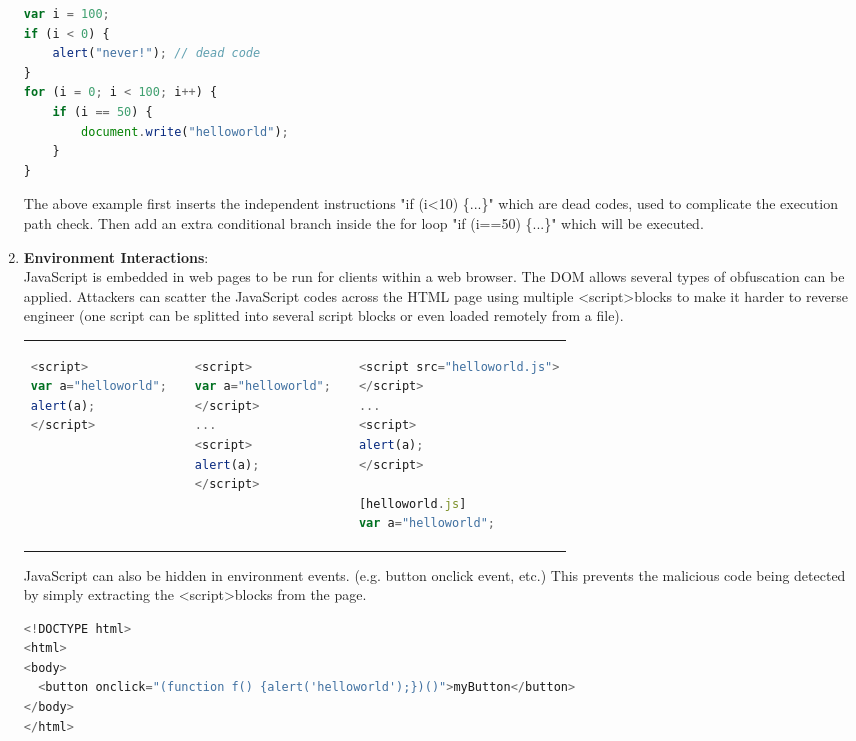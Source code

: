 \documentclass[11pt]{article}
\begin{document}
\begin{enumerate}
	\begin{lstlisting}[language=JavaScript, title=(logic structure obfuscation example)]
var i = 100;
if (i < 0) {
    alert("never!"); // dead code
}
for (i = 0; i < 100; i++) {
    if (i == 50) {
        document.write("helloworld");
    }
}
\end{lstlisting}
	The above example first inserts the independent instructions "if (i\textless 10) \{...\}" which are dead codes, used to complicate the execution path check. Then add an extra conditional branch inside the for loop "if (i==50) \{...\}" which will be executed.
	\item \textbf{Environment Interactions}\cite{Nofus}: \\
	JavaScript is embedded in web pages to be run for clients within a web browser. The DOM allows several types of obfuscation can be applied. Attackers can scatter the JavaScript codes across the HTML page using multiple \textless script\textgreater blocks to make it harder to reverse engineer (one script can be splitted into several script blocks or even loaded remotely from a file).  \\
	\begin{tabular}{p{4cm}p{0.02cm}p{4cm}p{0.02cm}p{5.6cm}}
			\begin{lstlisting}[language=JavaScript,alsolanguage=HTML5,  title=(self-contained block)]
<script>
var a="helloworld";
alert(a);
</script>
			\end{lstlisting} & & \begin{lstlisting}[language=JavaScript,alsolanguage=HTML5, title=(multiple script blocks) ]
<script>
var a="helloworld";
</script>
...
<script>
alert(a);
</script>
			\end{lstlisting}  & & \begin{lstlisting}[language=JavaScript,alsolanguage=HTML5,  title=(remote source file)]
<script src="helloworld.js">
</script>
...
<script>
alert(a);
</script>

[helloworld.js]
var a="helloworld";
			\end{lstlisting} 
	\end{tabular}  	 	
JavaScript can also be hidden in environment events. (e.g. button onclick event, etc.) This prevents the malicious code being detected by simply extracting the \textless script\textgreater blocks from the page. 
	\begin{lstlisting}[language=JavaScript,alsolanguage=HTML5, title=(script in events)]
<!DOCTYPE html>
<html>
<body>
  <button onclick="(function f() {alert('helloworld');})()">myButton</button>
</body>
</html>
  		\end{lstlisting} 	
\end{enumerate}
\newpage
\end{document}

